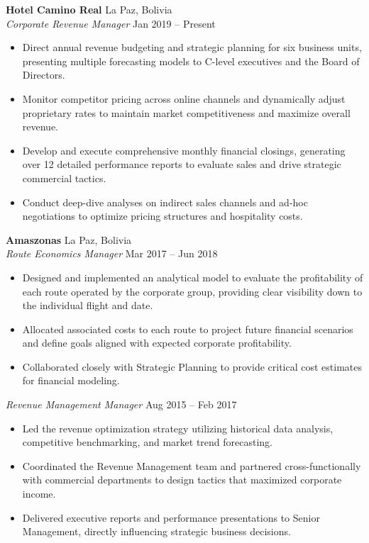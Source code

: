 \documentclass[11pt,a4paper,sans]{article}
\begin{document}
\textbf{Hotel Camino Real} \hfill La Paz, Bolivia \\
\textit{Corporate Revenue Manager} \hfill Jan 2019 -- Present
\begin{itemize}
    \item Direct annual revenue budgeting and strategic planning for six business units, presenting multiple forecasting models to C-level executives and the Board of Directors.
    \item Monitor competitor pricing across online channels and dynamically adjust proprietary rates to maintain market competitiveness and maximize overall revenue.
    \item Develop and execute comprehensive monthly financial closings, generating over 12 detailed performance reports to evaluate sales and drive strategic commercial tactics.
    \item Conduct deep-dive analyses on indirect sales channels and ad-hoc negotiations to optimize pricing structures and hospitality costs.
\end{itemize}

\vspace{6pt}

\textbf{Amaszonas} \hfill La Paz, Bolivia \\
\textit{Route Economics Manager} \hfill Mar 2017 -- Jun 2018
\begin{itemize}
    \item Designed and implemented an analytical model to evaluate the profitability of each route operated by the corporate group, providing clear visibility down to the individual flight and date.
    \item Allocated associated costs to each route to project future financial scenarios and define goals aligned with expected corporate profitability.
    \item Collaborated closely with Strategic Planning to provide critical cost estimates for financial modeling.
\end{itemize}

\vspace{2pt}
\textit{Revenue Management Manager} \hfill Aug 2015 -- Feb 2017
\begin{itemize}
    \item Led the revenue optimization strategy utilizing historical data analysis, competitive benchmarking, and market trend forecasting.
    \item Coordinated the Revenue Management team and partnered cross-functionally with commercial departments to design tactics that maximized corporate income.
    \item Delivered executive reports and performance presentations to Senior Management, directly influencing strategic business decisions.
\end{itemize}
\end{document}
